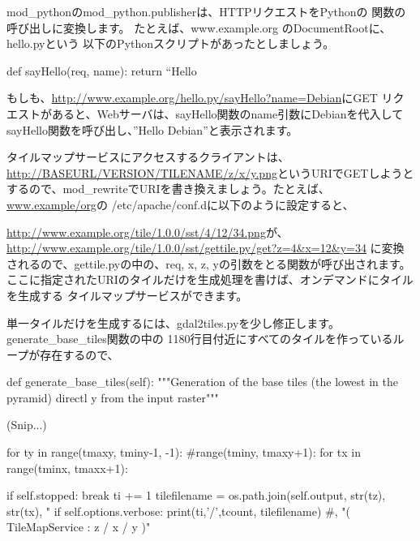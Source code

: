 \documentclass[mingoth,a4paper]{jsarticle}
\begin{document}
mod\_pythonのmod\_python.publisherは、HTTPリクエストをPythonの
関数の呼び出しに変換します。
たとえば、www.example.org のDocumentRootに、hello.pyという
以下のPythonスクリプトがあったとしましょう。
\begin{commandline}
def sayHello(req, name):
  return ``Hello %
\end{commandline}
もしも、\url{http://www.example.org/hello.py/sayHello?name=Debian}にGET
リクエストがあると、Webサーバは、sayHello関数のname引数にDebianを代入して
sayHello関数を呼び出し、''Hello Debian''と表示されます。

タイルマップサービスにアクセスするクライアントは、
\url{http://BASEURL/VERSION/TILENAME/z/x/y.png}というURIでGETしようと
するので、mod\_rewriteでURIを書き換えましょう。たとえば、\url{www.example/org}の
/etc/apache/conf.dに以下のように設定すると、
%
%
\url{http://www.example.org/tile/1.0.0/sst/4/12/34.png}が、
\url{http://www.example.org/tile/1.0.0/sst/gettile.py/get?z=4&x=12&y=34}
に変換されるので、gettile.pyの中の、req, x, z, yの引数をとる関数が呼び出されます。
ここに指定されたURIのタイルだけを生成処理を書けば、オンデマンドにタイルを生成する
タイルマップサービスができます。


単一タイルだけを生成するには、gdal2tiles.pyを少し修正します。
generate\_base\_tiles関数の中の
1180行目付近にすべてのタイルを作っているループが存在するので、

\begin{commandline}
     def generate_base_tiles(self):
         """Generation of the base tiles (the lowest in the pyramid) directl y from the input raster"""

                               (Snip...)

         for ty in range(tmaxy, tminy-1, -1): #range(tminy, tmaxy+1):
             for tx in range(tminx, tmaxx+1):

                 if self.stopped:
                     break
                 ti += 1
                 tilefilename = os.path.join(self.output, str(tz), str(tx), "%
                 if self.options.verbose:
                     print(ti,'/',tcount, tilefilename) #, "( TileMapService     : z / x / y )"
\end{commandline}
\end{document}
